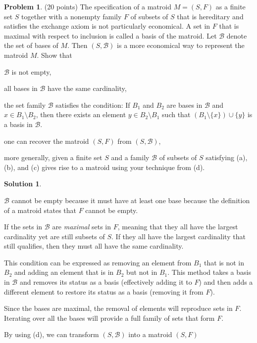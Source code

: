 \documentclass{article}
\theoremstyle{definition}
\newtheorem{problem}{Problem}
\newtheorem*{solution}{Solution}
\begin{document}
\begin{problem}(20 points) The specification of a matroid $M=(S,F)$ as
  a finite set $S$ together with a nonempty family $F$ of subsets of $S$ that
  is hereditary and satisfies the exchange axiom is not particularly
  economical. A set in $F$ that is maximal with respect to inclusion
  is called a basis of the matroid. Let $\mathcal{B}$ denote the set
  of bases of $M$. Then $(S,\mathcal{B})$ is a more economical
  way to represent the matroid $M$. Show that 
\begin{compactenum}[(a)]
\item $\mathcal{B}$ is not empty, 
\item all bases in $\mathcal{B}$ have the same cardinality,
\item the set family $\mathcal{B}$ satisfies the condition: If $B_1$
  and $B_2$ are bases in $\mathcal{B}$ and $x\in B_1\setminus B_2$,
  then there exists an element $y \in B_2\setminus B_1$ such that
  $(B_1\setminus \{x\} ) \cup \{y\}$ is a basis in $\mathcal{B}$. 
\item one can recover the matroid $(S,F)$ from $(S,\mathcal{B})$,
\item more generally, given a finite set $S$ and a family 
  $\mathcal{B}$ of subsets of $S$ satisfying (a), (b), and (c) gives
  rise to a matroid using your technique from (d). 
\end{compactenum}
\end{problem}
\begin{solution}
\begin{compactenum}[(a)]
\item $\mathcal{B}$ cannot be empty because it must have at least one base because the definition of a matroid states that $F$ cannot be empty.
\item If the sets in $\mathcal{B}$ are \textit{maximal} sets in $F$, meaning that they all have the largest cardinality yet are still subsets of $S$. If they all have the largest cardinality that still qualifies, then they must all have the same cardinality.
\item This condition can be expressed as removing an element from $B_1$ that is not in $B_2$ and adding an element that is in $B_2$ but not in $B_1$. This method takes a basis in $\mathcal{B}$ and removes its status as a basis (effectively adding it to $F$) and then adds a different element to restore its status as a basis (removing it from $F$).
\item Since the bases are maximal, the removal of elements will reproduce sets in $F$. Iterating over all the bases will provide a full family of sets that form $F$.
\item By using (d), we can transform $(S, \mathcal{B})$ into a matroid $(S, F)$
\end{compactenum}
\end{solution}
\end{document}
